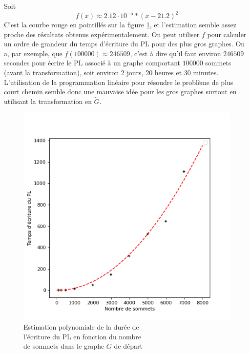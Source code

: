\documentclass{article}
\begin{document}
Soit
\begin{equation}
    f(x) \approx 2.12\cdot 10^{-5} * (x-21.2)^2
\end{equation}
C'est la courbe rouge en pointillés sur la figure \ref{fig:poly-fit}, et
l'estimation semble assez proche des résultats obtenus expérimentalement. On
peut utiliser $f$ pour calculer un ordre de grandeur du temps d'écriture du PL
pour des plus gros graphes. On a, par exemple, que $f(100 000) \approx 246 509$,
c'est à dire qu'il faut environ $246 509$ secondes pour écrire le PL associé à
un graphe comportant $100 000$ sommets (avant la transformation), soit environ 2 jours, 20 heures et 30 minutes. L'utilisation de
la programmation linéaire pour résoudre le problème de plus court chemin semble
donc une mauvaise idée pour les gros graphes surtout en utilisant la transformation en $\tilde{G}$.


\begin{figure}
\centering
\begin{minipage}{.5\textwidth}
\end{minipage}
\begin{minipage}{.5\textwidth}
    \centering
    \includegraphics[scale=0.5]{writing_time_poly_fit.png}
    \caption{Estimation polynomiale de la durée de\\l'écriture du PL en fonction du nombre\\de sommets dans le graphe $G$ de départ}
    \label{fig:poly-fit}
\end{minipage}
\end{figure}
\newpage
\end{document}
